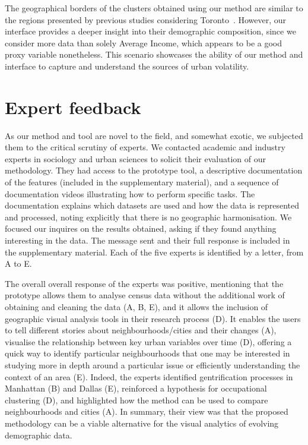 The geographical borders of the clusters obtained using our method are similar
to the regions presented by previous studies considering
Toronto~\citep{hulchanski2007three}. However, our interface provides a deeper
insight into their demographic composition, since we consider more data than
solely Average Income, which appears to be a good proxy variable nonetheless.
This scenario showcases the ability of our method and interface to capture and
understand the sources of urban volatility.

\section{Expert feedback}
\label{sec:expert}
As our method and tool are novel to the field, and somewhat exotic,  we
subjected them to the critical scrutiny of experts. We contacted academic and
industry experts in sociology and urban sciences to solicit their evaluation of
our methodology. They had access to the prototype tool, a descriptive
documentation of the features (included in the supplementary material), and a
sequence of documentation videos illustrating how to perform specific tasks. The
documentation explains which datasets are used and how the data is represented
and processed, noting explicitly that there is no geographic harmonisation. We
focused our inquires on the results obtained, asking if they found anything
interesting in the data. The message sent and their full response is included in
the supplementary material. Each of the five experts is identified by a letter,
from A to E. 



The overall overall response of the experts was positive,  mentioning that the
prototype allows them to analyse census data without the additional work of
obtaining and cleaning the data (A, B, E), and it allows the inclusion of
geographic visual analysis tools in their research process (D). It enables the
users to tell different stories about neighbourhoods/cities and their changes
(A), visualise the relationship between key urban variables over time (D),
offering a quick way to identify particular neighbourhoods that one may be
interested in studying more in depth around a particular issue or efficiently
understanding the context of an area (E).  Indeed, the experts identified
gentrification processes in Manhattan (B) and Dallas (E), reinforced a
hypothesis for occupational clustering (D), and highlighted how the method can
be used to compare neighbourhoods and cities (A). In summary, their view was that
the proposed methodology can be a viable alternative for the visual analytics of
evolving demographic data.



